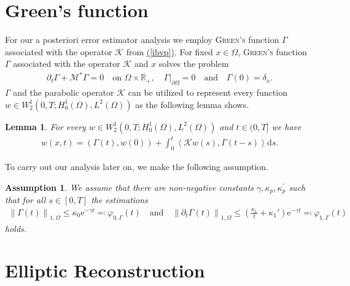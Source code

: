 \documentclass[11pt, a4paper]{article}
\newtheorem{lemma}{Lemma}
\newtheorem{ass}{Assumption}
\renewcommand{\eqref}[1]{\hyperref[#1]{(\ref{#1})}}  %
\newcommand{\pt}{\partial}
\renewcommand{\phi}{\varphi}
\newcommand{\scal}[2]{\left(#1,#2\right)}
\newcommand{\dual}[2]{\left\langle#1,#2\right\rangle}
\newcommand{\m}[1]{\mathcal{#1}}
\newcommand{\mK}{\mathcal{K}}
\newcommand{\mM}{\mathcal{M}}
\newcommand{\E}{\mathrm{e}}
\newcommand{\D}{\mathrm{d}}
\newcommand{\norm}[1]{\left\|#1\right\|}
\begin{document}
	\section{Green's function}\label{sec:green}
	For our a posteriori error estimator analysis we employ \textsc{Green's} function $\Gamma$ associated with the operator $\mK$ from \eqref{ibvp}. For fixed $x\in \Omega$, \textsc{Green's} function $\Gamma$ associated with the operator $\mK$ and $x$ solves the problem
	\begin{gather}\label{eq:green-func}
		\pt_t \Gamma + \mM^* \Gamma = 0 \quad \text{on } \Omega \times \mathbb{R}_+, \quad \Gamma \big|_{\pt \Omega} = 0 \quad \text{and} \quad \Gamma(0) = \delta_x.
	\end{gather}
	$\Gamma$ and the parabolic operator \(\m{K}\) can be utilized to represent every function \mbox{$w \in W^1_2(0,T;H^1_0(\Omega), L^2(\Omega))$} as the following lemma shows.
	\begin{lemma}\label{lem:w-green}
		For every $w \in W^1_2(0,T;H^1_0(\Omega), L^2(\Omega))$ and $t\in(0,T]$ we have
		\begin{gather}\label{eq:w-green}
			w(x,t) = \scal{\Gamma(t)}{w(0)} + \int_{0}^{t} \dual{\mK w(s)}{\Gamma(t-s)} \D s.
		\end{gather} 
	\end{lemma}
	To carry out our analysis later on, we make the following assumption.
	\begin{ass}\label{ass:green}
		We assume that there are non-negative constants $\gamma, \kappa_p, \kappa_p^\prime$ such that for all $s\in[0,T]$ the estimations
		\begin{gather*}
			\norm{\Gamma(t)}_{1, \Omega} \leq \kappa_0 \E^{- \gamma t} \eqqcolon \phi_{0,\Gamma}(t) \quad \text{and} \quad \norm{\pt_t \Gamma(t)}_{1, \Omega} \leq \left(\frac{\kappa_1}{t} + \kappa_1'\right) \E^{-\gamma t} \eqqcolon \phi_{1,\Gamma}(t) 
		\end{gather*}
		holds. 
	\end{ass}
	
	\section{Elliptic Reconstruction}\label{sec:ell-rec}
\end{document}
